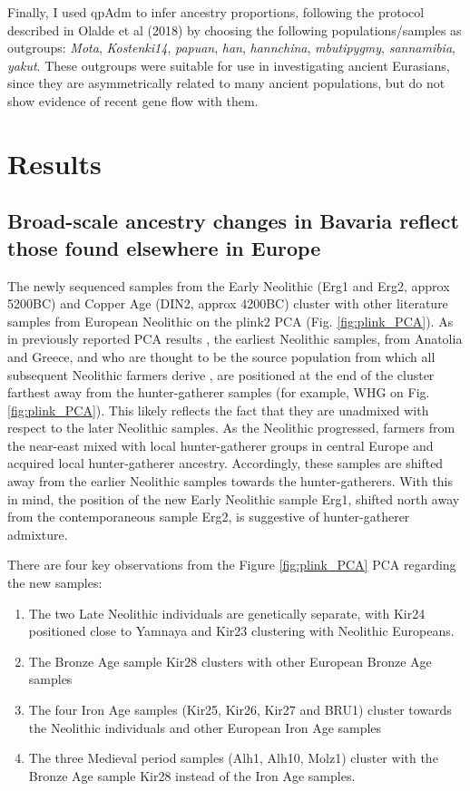 Finally, I used qpAdm to infer ancestry proportions, following the protocol described in Olalde et al (2018) by choosing the following populations/samples as outgroups: \textit{Mota}, \textit{Kostenki14}, \textit{papuan}, \textit{han}, \textit{hannchina}, \textit{mbutipygmy}, \textit{sannamibia}, \textit{yakut}. These outgroups were suitable for use in investigating ancient Eurasians, since they are asymmetrically related to many ancient populations, but do not show evidence of recent gene flow with them. 

\section{Results}

\subsection{Broad-scale ancestry changes in Bavaria reflect those found elsewhere in Europe}

The newly sequenced samples from the Early Neolithic (Erg1 and Erg2, approx 5200BC) and Copper Age (DIN2, approx 4200BC) cluster with other literature samples from European Neolithic on the plink2 PCA (Fig. \ref{fig:plink_PCA}). As in previously reported PCA results \cite{Lipson2017b}, the earliest Neolithic samples, from Anatolia and Greece, and who are thought to be the source population from which all subsequent Neolithic farmers derive \cite{Hofmanova2016, Haak2010, haak2005ancient, bramanti2009genetic, Lazaridis2014}, are  positioned at the end of the cluster farthest away from the hunter-gatherer samples (for example, WHG on Fig. \ref{fig:plink_PCA}). This likely reflects the fact that they are unadmixed with respect to the later Neolithic samples. As the Neolithic progressed, farmers from the near-east mixed with local hunter-gatherer groups in central Europe \cite{Lipson2017b} and acquired local hunter-gatherer ancestry. Accordingly, these samples are shifted away from the earlier Neolithic samples towards the hunter-gatherers. With this in mind, the position of the new Early Neolithic sample Erg1, shifted north away from the contemporaneous sample Erg2, is suggestive of hunter-gatherer admixture. 

There are four key observations from the Figure \ref{fig:plink_PCA} PCA regarding the new samples:

\begin{enumerate}
\item The two Late Neolithic individuals are genetically separate, with Kir24 positioned close to Yamnaya and Kir23 clustering with Neolithic Europeans.
\item The Bronze Age sample Kir28 clusters with other European Bronze Age samples
\item The four Iron Age samples (Kir25, Kir26, Kir27 and BRU1) cluster towards the Neolithic individuals and other European Iron Age samples
\item The three Medieval period samples (Alh1, Alh10, Molz1) cluster with the Bronze Age sample Kir28 instead of the Iron Age samples.
\end{enumerate}


